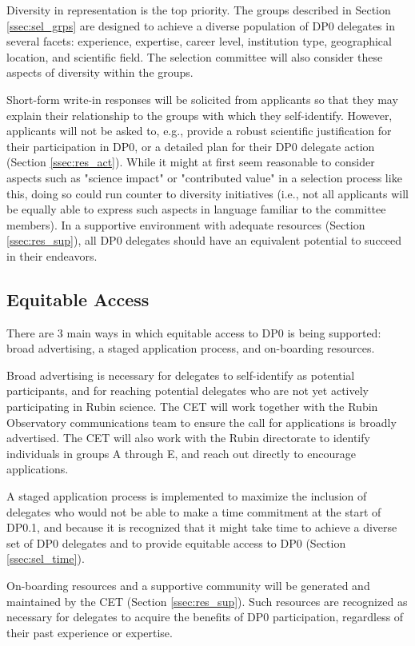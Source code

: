 \documentclass[DM,lsstdraft,authoryear,toc]{lsstdoc}
\begin{document}
Diversity in representation is the top priority.
The groups described in Section \ref{ssec:sel_grps} are designed to achieve a diverse population of DP0 delegates in several facets: experience, expertise, career level, institution type, geographical location, and scientific field.
The selection committee will also consider these aspects of diversity within the groups.

Short-form write-in responses will be solicited from applicants so that they may explain their relationship to the groups with which they self-identify.
However, applicants will not be asked to, e.g., provide a robust scientific justification for their participation in DP0, or a detailed plan for their DP0 delegate action (Section \ref{ssec:res_act}).
While it might at first seem reasonable to consider aspects such as "science impact" or "contributed value" in a selection process like this, doing so could run counter to diversity initiatives (i.e., not all applicants will be equally able to express such aspects in language familiar to the committee members).
In a supportive environment with adequate resources (Section \ref{ssec:res_sup}), all DP0 delegates should have an equivalent potential to succeed in their endeavors.

\subsection{Equitable Access}\label{ssec:sel_equity}

There are 3 main ways in which equitable access to DP0 is being supported: broad advertising, a staged application process, and on-boarding resources.

Broad advertising is necessary for delegates to self-identify as potential participants, and for reaching potential delegates who are not yet actively participating in Rubin science.
The CET will work together with the Rubin Observatory communications team to ensure the call for applications is broadly advertised. 
The CET will also work with the Rubin directorate to identify individuals in groups A through E, and reach out directly to encourage applications. 

A staged application process is implemented to maximize the inclusion of delegates who would not be able to make a time commitment at the start of DP0.1, and because it is recognized that it might take time to achieve a diverse set of DP0 delegates and to provide equitable access to DP0 (Section \ref{ssec:sel_time}).

On-boarding resources and a supportive community will be generated and maintained by the CET (Section \ref{ssec:res_sup}).
Such resources are recognized as necessary for delegates to acquire the benefits of DP0 participation, regardless of their past experience or expertise. 
\end{document}
